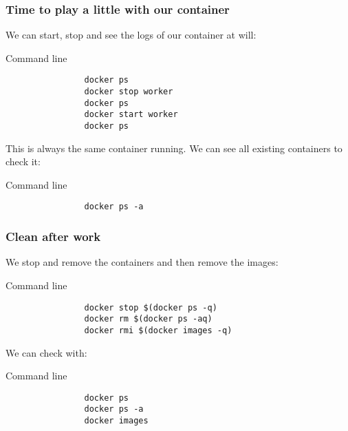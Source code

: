 	\begin{frame}[fragile]
		\frametitle{Time to play a little with our container}
		
		We can start, stop and see the logs of our container at will:
		\begin{block}{Command line}
			\begin{verbatim}
				docker ps
				docker stop worker
				docker ps
				docker start worker
				docker ps
			\end{verbatim}
		\end{block}
		
		\bigskip
		This is always the same container running. We can see all existing containers to check it:
		\begin{block}{Command line}
			\begin{verbatim}
				docker ps -a
			\end{verbatim}
		\end{block}

	\end{frame}
	
	\begin{frame}[fragile]
		\frametitle{Clean after work}
		
		We stop and remove the containers and then remove the images:
		\begin{block}{Command line}
			\begin{verbatim}
				docker stop $(docker ps -q)
				docker rm $(docker ps -aq)
				docker rmi $(docker images -q)
			\end{verbatim}
		\end{block}
				
		\bigskip
		We can check with:
		\begin{block}{Command line}
			\begin{verbatim}
				docker ps
				docker ps -a
				docker images
			\end{verbatim}
		\end{block}

	\end{frame}